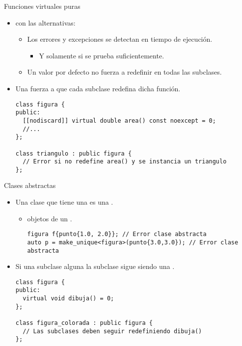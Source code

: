 \begin{frame}[t,fragile]{Funciones virtuales puras}
\begin{itemize}
  \item {} con las alternativas:
    \begin{itemize}
      \item Los errores y excepciones se detectan en tiempo de ejecución.
        \begin{itemize}
          \item Y solamente si se prueba suficientemente.
        \end{itemize}
      \item Un valor por defecto no fuerza a redefinir en todas las subclases.
    \end{itemize}

  \item Una  fuerza a que cada subclase
        redefina dicha función.
\begin{lstlisting}[escapechar=@]
class figura {
public:
  [[nodiscard]] virtual double area() const noexcept = 0;
  //...
};

class triangulo : public figura {
  // Error si no redefine area() y se instancia un triangulo
};
\end{lstlisting}

\end{itemize}
\end{frame}

\begin{frame}[t,fragile]{Clases abstractas}
\begin{itemize}
  \item Una clase que tiene  una 
        es una .
    \begin{itemize}
      \item {} objetos de un .
\begin{lstlisting}
figura f{punto{1.0, 2.0}}; // Error clase abstracta
auto p = make_unique<figura>(punto{3.0,3.0}); // Error clase abstracta
\end{lstlisting}
    \end{itemize}

  \item Si una subclase  alguna 
        la subclase sigue siendo una .
\begin{lstlisting}
class figura {
public:
  virtual void dibuja() = 0;
};

class figura_colorada : public figura {
  // Las subclases deben seguir redefiniendo dibuja()
};
\end{lstlisting}
\end{itemize}
\end{frame}

